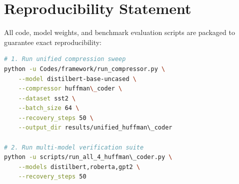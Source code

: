 \section{Reproducibility Statement}
All code, model weights, and benchmark evaluation scripts are packaged to guarantee exact reproducibility:
\begin{lstlisting}[language=bash]
# 1. Run unified compression sweep
python -u Codes/framework/run_compressor.py \
    --model distilbert-base-uncased \
    --compressor huffman\_coder \
    --dataset sst2 \
    --batch_size 64 \
    --recovery_steps 50 \
    --output_dir results/unified_huffman\_coder

# 2. Run multi-model verification suite
python -u scripts/run_all_4_huffman\_coder.py \
    --models distilbert,roberta,gpt2 \
    --recovery_steps 50
\end{lstlisting}
